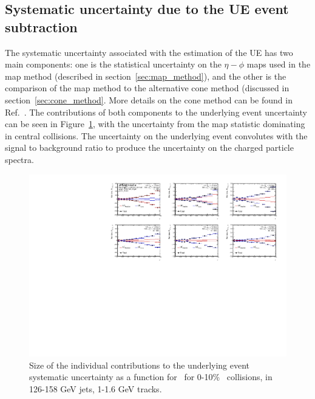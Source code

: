 \subsection{Systematic uncertainty due to the UE event subtraction}
The systematic uncertainty associated with the estimation of the UE has two main components: one is the statistical uncertainty on the $\eta-\phi$ maps used in the map method (described in section~\ref{sec:map_method}), and the other is the comparison of the map method to the alternative cone method (discussed in section~\ref{sec:cone_method}.
More details on the cone method can be found in Ref.~\cite{PhysRevC.98.024908}.
The contributions of both components to the underlying event uncertainty can be seen in Figure~\ref{fig:UE_sys_contrib}, with the uncertainty from the map statistic dominating in central collisions.
The uncertainty on the underlying event convolutes with the signal to background ratio to produce the uncertainty on the charged particle spectra.

\begin{figure}
\centering
\includegraphics[page=1,width=1.\textwidth]{figures/main/systematics/Summary_UE_RDpT_dR_sys_error}
\caption{Size of the individual contributions to the underlying event systematic uncertainty as a function for \rvar\ for 0-10\% \pbpb\ collisions, in 126-158 GeV jets, 1-1.6 GeV tracks.}
\label{fig:UE_sys_contrib}
\end{figure}


